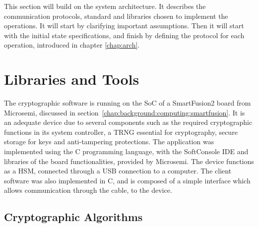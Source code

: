 \cleardoublepage
\label{chap:implementation}

This section will build on the system architecture. It describes the communication protocols, standard and libraries chosen to implement the operations. It will start by clarifying important assumptions. Then it will start with the initial state specifications, and finish by defining the protocol for each operation, introduced in chapter \ref{chap:arch}.

\section{Libraries and Tools}\label{chap:implementation:tools}

The cryptographic software is running on the \ac{SoC} of a SmartFusion2 board from Microsemi, discussed in section~\ref{chap:background:computing:smartfusion}. It is an adequate device due to several components such as the required cryptographic functions in its system controller, a \ac{TRNG} essential for cryptography, secure storage for keys and anti-tampering protections.
The application was implemented using the C programming language, with the SoftConsole \ac{IDE} and libraries of the board functionalities, provided by Microsemi. The device functions as a \ac{HSM}, connected through a \ac{USB} connection to a computer.
The client software was also implemented in C, and is composed of a simple interface which allows communication through the cable, to the device.

\subsection{Cryptographic Algorithms}\label{chap:implementation:tools:algorithms}

